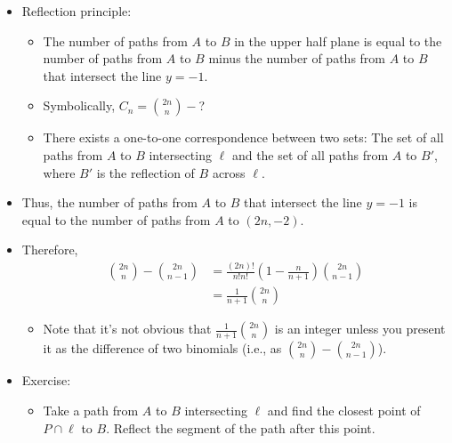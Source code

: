 \documentclass[../main.tex]{subfiles}
\begin{document}
\begin{itemize}
\begin{itemize}
    \end{itemize}
    \item Reflection principle:
    \begin{itemize}
        \item The number of paths from $A$ to $B$ in the upper half plane is equal to the number of paths from $A$ to $B$ minus the number of paths from $A$ to $B$ that intersect the line $y=-1$.
        \item Symbolically, $C_n=\binom{2n}{n}-$?
        \item There exists a one-to-one correspondence between two sets: The set of all paths from $A$ to $B$ intersecting $\ell$ and the set of all paths from $A$ to $B'$, where $B'$ is the reflection of $B$ across $\ell$.
    \end{itemize}
    \item Thus, the number of paths from $A$ to $B$ that intersect the line $y=-1$ is equal to the number of paths from $A$ to $(2n,-2)$.
    \item Therefore,
    \begin{align*}
        \binom{2n}{n}-\binom{2n}{n-1} &= \frac{(2n)!}{n!n!}\left( 1-\frac{n}{n+1} \right)\binom{2n}{n-1}\\
        &= \frac{1}{n+1}\binom{2n}{n}
    \end{align*}
    \begin{itemize}
        \item Note that it's not obvious that $\frac{1}{n+1}\binom{2n}{n}$ is an integer unless you present it as the difference of two binomials (i.e., as $\binom{2n}{n}-\binom{2n}{n-1}$).
    \end{itemize}
    \item Exercise:
    \begin{itemize}
        \item Take a path from $A$ to $B$ intersecting $\ell$ and find the closest point of $P\cap\ell$ to $B$. Reflect the segment of the path after this point.
    \end{itemize}
\end{itemize}
\end{document}
